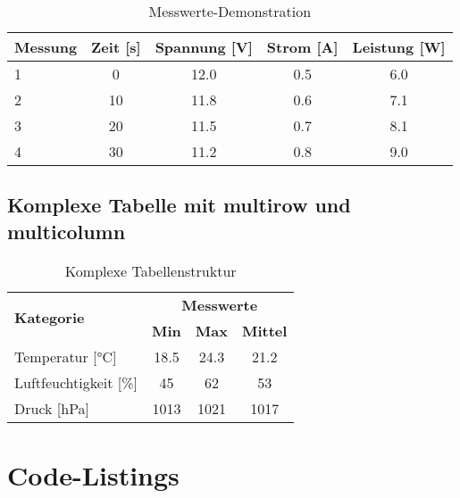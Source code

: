 \begin{table}[h]
	\centering
	\caption{Messwerte-Demonstration}
	\label{tab:messwerte}
	\begin{tabular}{|l|c|c|c|c|}
		\hline
		\textbf{Messung} & \textbf{Zeit [s]} & \textbf{Spannung [V]} & \textbf{Strom [A]} & \textbf{Leistung [W]} \\
		\hline
		1                & 0                 & 12.0                  & 0.5                & 6.0                   \\
		2                & 10                & 11.8                  & 0.6                & 7.1                   \\
		3                & 20                & 11.5                  & 0.7                & 8.1                   \\
		4                & 30                & 11.2                  & 0.8                & 9.0                   \\
		\hline
	\end{tabular}
\end{table}

\subsection*{Komplexe Tabelle mit multirow und multicolumn}
\label{subsec:komplexe_tabelle}

\begin{table}[h]
	\centering
	\caption{Komplexe Tabellenstruktur}
	\label{tab:komplex}
	\begin{tabular}{|l|c|c|c|}
		\hline
		\multirow{2}{*}{\textbf{Kategorie}} & \multicolumn{3}{c|}{\textbf{Messwerte}}                                  \\
		\cline{2-4}
		                                    & \textbf{Min}                            & \textbf{Max} & \textbf{Mittel} \\
		\hline
		Temperatur [°C]                     & 18.5                                    & 24.3         & 21.2            \\
		Luftfeuchtigkeit [\%]               & 45                                      & 62           & 53              \\
		Druck [hPa]                         & 1013                                    & 1021         & 1017            \\
		\hline
	\end{tabular}
\end{table}

\section{Code-Listings}
\label{sec:code_listings}

